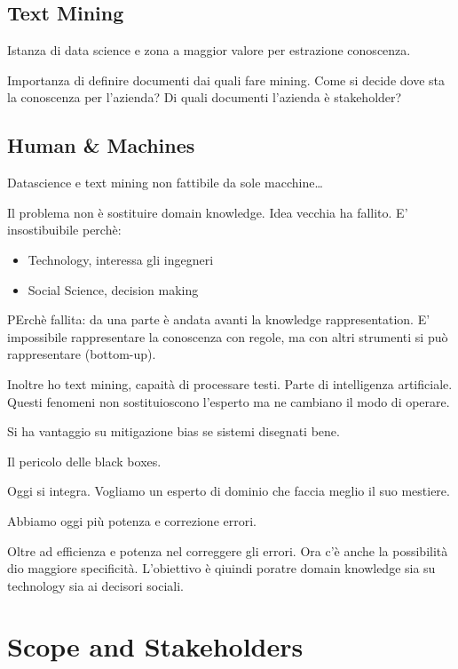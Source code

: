\documentclass[]{book}
\providecommand{\tightlist}{%
  \setlength{\itemsep}{0pt}\setlength{\parskip}{0pt}}
\begin{document}
\section{Text Mining}\label{text-mining}

Istanza di data science e zona a maggior valore per estrazione
conoscenza.

Importanza di definire documenti dai quali fare mining. Come si decide
dove sta la conoscenza per l'azienda? Di quali documenti l'azienda è
stakeholder?

\section{Human \& Machines}\label{human-machines}

Datascience e text mining non fattibile da sole macchine\ldots{}

Il problema non è sostituire domain knowledge. Idea vecchia ha fallito.
E' insostibuibile perchè:

\begin{itemize}
\tightlist
\item
  Technology, interessa gli ingegneri
\item
  Social Science, decision making
\end{itemize}

PErchè fallita: da una parte è andata avanti la knowledge
rappresentation. E' impossibile rappresentare la conoscenza con regole,
ma con altri strumenti si può rappresentare (bottom-up).

Inoltre ho text mining, capaità di processare testi. Parte di
intelligenza artificiale. Questi fenomeni non sostituioscono l'esperto
ma ne cambiano il modo di operare.

Si ha vantaggio su mitigazione bias se sistemi disegnati bene.

Il pericolo delle black boxes.

Oggi si integra. Vogliamo un esperto di dominio che faccia meglio il suo
mestiere.

Abbiamo oggi più potenza e correzione errori.

Oltre ad efficienza e potenza nel correggere gli errori. Ora c'è anche
la possibilità dio maggiore specificità. L'obiettivo è qiuindi poratre
domain knowledge sia su technology sia ai decisori sociali.

\chapter{Scope and Stakeholders}\label{scope-and-stakeholders}
\end{document}
